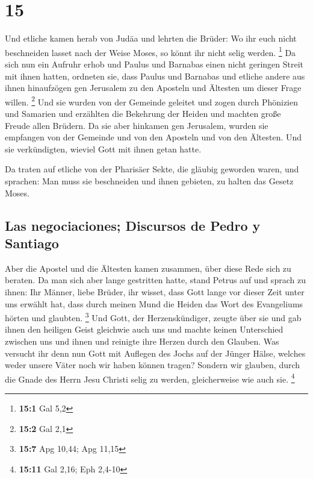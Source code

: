 \hypertarget{section-14}{%
\section{15}\label{section-14}}

 Und etliche kamen herab von Judäa und lehrten die Brüder:
Wo ihr euch nicht beschneiden lasset nach der Weise Moses, so könnt ihr
nicht selig werden. \footnote{\textbf{15:1} Gal 5,2}  Da
sich nun ein Aufruhr erhob und Paulus und Barnabas einen nicht geringen
Streit mit ihnen hatten, ordneten sie, dass Paulus und Barnabas und
etliche andere aus ihnen hinaufzögen gen Jerusalem zu den Aposteln und
Ältesten um dieser Frage willen. \footnote{\textbf{15:2} Gal 2,1}
 Und sie wurden von der Gemeinde geleitet und zogen durch
Phönizien und Samarien und erzählten die Bekehrung der Heiden und
machten große Freude allen Brüdern.  Da sie aber hinkamen
gen Jerusalem, wurden sie empfangen von der Gemeinde und von den
Aposteln und von den Ältesten. Und sie verkündigten, wieviel Gott mit
ihnen getan hatte.

 Da traten auf etliche von der Pharisäer Sekte, die
gläubig geworden waren, und sprachen: Man muss sie beschneiden und ihnen
gebieten, zu halten das Gesetz Moses.

\hypertarget{las-negociaciones-discursos-de-pedro-y-santiago}{%
\subsection{Las negociaciones; Discursos de Pedro y
Santiago}\label{las-negociaciones-discursos-de-pedro-y-santiago}}

 Aber die Apostel und die Ältesten kamen zusammen, über
diese Rede sich zu beraten.  Da man sich aber lange
gestritten hatte, stand Petrus auf und sprach zu ihnen: Ihr Männer,
liebe Brüder, ihr wisset, dass Gott lange vor dieser Zeit unter uns
erwählt hat, dass durch meinen Mund die Heiden das Wort des Evangeliums
hörten und glaubten. \footnote{\textbf{15:7} Apg 10,44; Apg 11,15}
 Und Gott, der Herzenskündiger, zeugte über sie und gab
ihnen den heiligen Geist gleichwie auch uns  und machte
keinen Unterschied zwischen uns und ihnen und reinigte ihre Herzen durch
den Glauben.  Was versucht ihr denn nun Gott mit Auflegen
des Jochs auf der Jünger Hälse, welches weder unsere Väter noch wir
haben können tragen?  Sondern wir glauben, durch die
Gnade des Herrn Jesu Christi selig zu werden, gleicherweise wie auch
sie. \footnote{\textbf{15:11} Gal 2,16; Eph 2,4-10}

